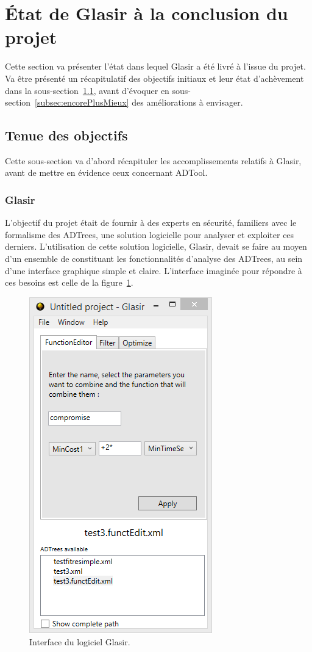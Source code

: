 \section{État de Glasir à la conclusion du projet}
\label{sec:etatFinal}

Cette section va présenter  l'état dans lequel Glasir a été 
livré à l'issue du projet. Va être présenté  un récapitulatif des objectifs initiaux et leur état d'achèvement dans la {\sc sous-section}~\ref{subsec:objOK}, avant d'évoquer en {\sc sous-section}~\ref{subsec:encorePlusMieux} des améliorations à envisager.

\subsection{Tenue des objectifs}
\label{subsec:objOK}

Cette sous-section va d'abord récapituler  les accomplissements relatifs à Glasir, avant de mettre en évidence ceux concernant ADTool.

\subsubsection{Glasir}
\label{sssec:obj_glasir}

L'objectif du projet était de fournir à des experts en sécurité, familiers avec le formalisme des ADTrees, une solution logicielle pour analyser et exploiter ces derniers. L'utilisation de cette solution logicielle, Glasir, devait se faire au moyen d'un ensemble de \fg 
{}
constituant les fonctionnalités d'analyse des ADTrees, au sein d'une interface graphique simple et claire. L'interface imaginée pour répondre à ces besoins est celle de la {\sc figure}~\ref{fig:InterfaceGlasir}.

    \begin{figure}[H]
        \centering
        \includegraphics[height=0.75\textwidth]{figure/interface.png}
        \caption{Interface du logiciel Glasir.}
        \label{fig:InterfaceGlasir}
    \end{figure}

